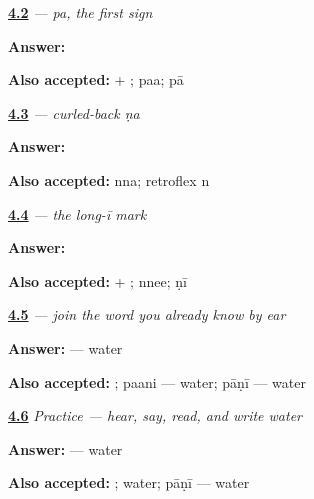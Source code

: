 \noindent\begin{minipage}[t]{\linewidth}
\raggedright
\hyperlink{review-MW-W04-pa-build-paa}{\textbf{4.2}} \emph{ — \emph{pa}, the first sign}\par
\small \textbf{Answer:} \par
\footnotesize \textbf{Also accepted:}  + ; paa; pā
\end{minipage}\par\medskip

\noindent\begin{minipage}[t]{\linewidth}
\raggedright
\hyperlink{review-MW-W04-nna-contrast}{\textbf{4.3}} \emph{ — curled-back \emph{ṇa}}\par
\small \textbf{Answer:} \par
\footnotesize \textbf{Also accepted:} nna; retroflex n
\end{minipage}\par\medskip

\noindent\begin{minipage}[t]{\linewidth}
\raggedright
\hyperlink{review-MW-W04-ii-matra-build}{\textbf{4.4}} \emph{ — the long-\emph{ī} mark}\par
\small \textbf{Answer:} \par
\footnotesize \textbf{Also accepted:}  + ; nnee; ṇī
\end{minipage}\par\medskip

\noindent\begin{minipage}[t]{\linewidth}
\raggedright
\hyperlink{review-MW-C04-paani-build}{\textbf{4.5}} \emph{ — join the word you already know by ear}\par
\small \textbf{Answer:}  — water\par
\footnotesize \textbf{Also accepted:} ; paani — water; pāṇī — water
\end{minipage}\par\medskip

\noindent\begin{minipage}[t]{\linewidth}
\raggedright
\hyperlink{review-MW-C04-practice-paani}{\textbf{4.6}} \emph{Practice — hear, say, read, and write water}\par
\small \textbf{Answer:}  — water\par
\footnotesize \textbf{Also accepted:} ;  water; pāṇī — water
\end{minipage}\par\medskip


